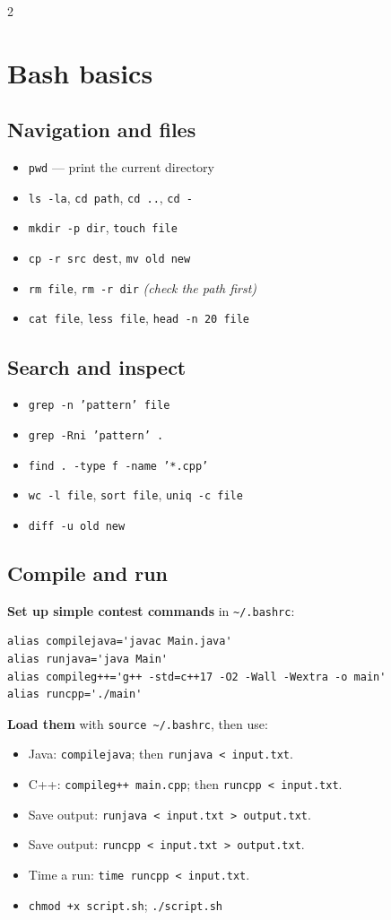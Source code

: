 \documentclass[10pt]{article}
\newcommand{\cmd}[1]{\texttt{\small #1}}
\newcommand{\code}[1]{\texttt{#1}}
\begin{document}
\begin{multicols}{2}

\section{Bash basics}
\subsection{Navigation and files}
\begin{itemize}
  \item \cmd{pwd} --- print the current directory
  \item \cmd{ls -la}, \cmd{cd path}, \cmd{cd ..}, \cmd{cd -}
  \item \cmd{mkdir -p dir}, \cmd{touch file}
  \item \cmd{cp -r src dest}, \cmd{mv old new}
  \item \cmd{rm file}, \cmd{rm -r dir} \textit{(check the path first)}
  \item \cmd{cat file}, \cmd{less file}, \cmd{head -n 20 file}
\end{itemize}

\subsection{Search and inspect}
\begin{itemize}
  \item \cmd{grep -n 'pattern' file}
  \item \cmd{grep -Rni 'pattern' .}
  \item \cmd{find . -type f -name '*.cpp'}
  \item \cmd{wc -l file}, \cmd{sort file}, \cmd{uniq -c file}
  \item \cmd{diff -u old new}
\end{itemize}

\subsection{Compile and run}
\textbf{Set up simple contest commands} in \code{\textasciitilde/.bashrc}:
\scriptsize
\begin{verbatim}
alias compilejava='javac Main.java'
alias runjava='java Main'
alias compileg++='g++ -std=c++17 -O2 -Wall -Wextra -o main'
alias runcpp='./main'
\end{verbatim}
\normalsize
\textbf{Load them} with \cmd{source \textasciitilde/.bashrc}, then use:
\begin{itemize}
  \item Java: \cmd{compilejava}; then \cmd{runjava < input.txt}.
  \item C++: \cmd{compileg++ main.cpp}; then \cmd{runcpp < input.txt}.
  \item Save output: \cmd{runjava < input.txt > output.txt}.
  \item Save output: \cmd{runcpp < input.txt > output.txt}.
  \item Time a run: \cmd{time runcpp < input.txt}.
  \item \cmd{chmod +x script.sh}; \cmd{./script.sh}
\end{itemize}


\end{multicols}
\end{document}
